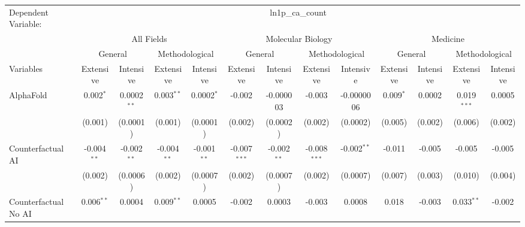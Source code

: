 \begingroup
\centering
\begin{tabular}{lcccccccccccc}
   \tabularnewline \midrule \midrule
   Dependent Variable: & \multicolumn{12}{c}{ln1p\_ca\_count}\\
 & \multicolumn{4}{c}{All Fields} & \multicolumn{4}{c}{Molecular Biology} & \multicolumn{4}{c}{Medicine} \\
\cmidrule(lr){2-5} \cmidrule(lr){6-9} \cmidrule(lr){10-13}
 & \multicolumn{2}{c}{General} & \multicolumn{2}{c}{Methodological} & \multicolumn{2}{c}{General} & \multicolumn{2}{c}{Methodological} & \multicolumn{2}{c}{General} & \multicolumn{2}{c}{Methodological} \\
\cmidrule(lr){2-3} \cmidrule(lr){4-5} \cmidrule(lr){6-7} \cmidrule(lr){8-9} \cmidrule(lr){10-11} \cmidrule(lr){12-13}
Variables & \multicolumn{1}{c}{Extensive} & \multicolumn{1}{c}{Intensive} & \multicolumn{1}{c}{Extensive} & \multicolumn{1}{c}{Intensive} & \multicolumn{1}{c}{Extensive} & \multicolumn{1}{c}{Intensive} & \multicolumn{1}{c}{Extensive} & \multicolumn{1}{c}{Intensive} & \multicolumn{1}{c}{Extensive} & \multicolumn{1}{c}{Intensive} & \multicolumn{1}{c}{Extensive} & \multicolumn{1}{c}{Intensive} \\
\cmidrule(lr){1-1}\cmidrule(lr){2-2} \cmidrule(lr){3-3} \cmidrule(lr){4-4} \cmidrule(lr){5-5} \cmidrule(lr){6-6} \cmidrule(lr){7-7} \cmidrule(lr){8-8} \cmidrule(lr){9-9} \cmidrule(lr){10-10} \cmidrule(lr){11-11} \cmidrule(lr){12-12} \cmidrule(lr){13-13}
   AlphaFold                                & 0.002$^{*}$   & 0.0002$^{**}$ & 0.003$^{**}$  & 0.0002$^{*}$  & -0.002         & -0.000003     & -0.003         & -0.0000006    & 0.009$^{*}$   & 0.0002   & 0.019$^{***}$  & 0.0005\\   
                                            & (0.001)       & (0.0001)      & (0.001)       & (0.0001)      & (0.002)        & (0.0002)      & (0.002)        & (0.0002)      & (0.005)       & (0.002)  & (0.006)        & (0.002)\\   
   Counterfactual AI                        & -0.004$^{**}$ & -0.002$^{**}$ & -0.004$^{**}$ & -0.001$^{**}$ & -0.007$^{***}$ & -0.002$^{**}$ & -0.008$^{***}$ & -0.002$^{**}$ & -0.011        & -0.005   & -0.005         & -0.005\\   
                                            & (0.002)       & (0.0006)      & (0.002)       & (0.0007)      & (0.002)        & (0.0007)      & (0.002)        & (0.0007)      & (0.007)       & (0.003)  & (0.010)        & (0.004)\\   
   Counterfactual No AI                     & 0.006$^{**}$  & 0.0004        & 0.009$^{**}$  & 0.0005        & -0.002         & 0.0003        & -0.003         & 0.0008        & 0.018         & -0.003   & 0.033$^{**}$   & -0.002\\   

\end{tabular}
